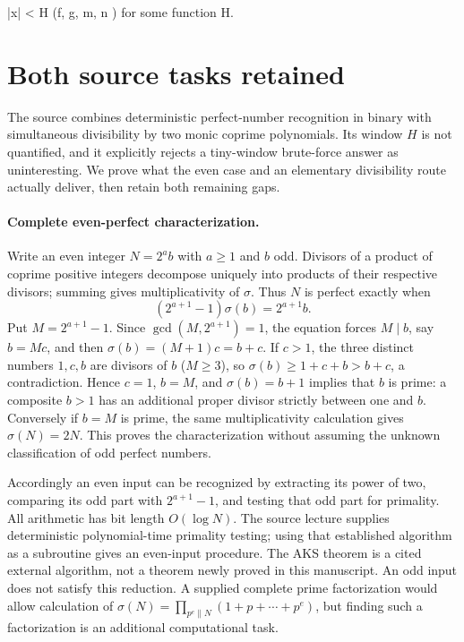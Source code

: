 \documentclass[11pt]{article}
\begin{document}
|x| < H (f, g, m, n ) for some function H.

\section{Both source tasks retained}
The source combines deterministic perfect-number recognition in binary
with simultaneous divisibility by two monic coprime polynomials. Its
window $H$ is not quantified, and it explicitly rejects a tiny-window
brute-force answer as uninteresting. We prove what the even case and
an elementary divisibility route actually deliver, then retain both
remaining gaps.

\paragraph{Complete even-perfect characterization.}
Write an even integer $N=2^a b$ with $a\ge1$ and $b$ odd. Divisors
of a product of coprime positive integers decompose uniquely into
products of their respective divisors; summing gives multiplicativity
of $\sigma$. Thus $N$ is perfect exactly when
\[
(2^{a+1}-1)\sigma(b)=2^{a+1}b.
\]
Put $M=2^{a+1}-1$. Since $\gcd(M,2^{a+1})=1$, the equation forces
$M\mid b$, say $b=Mc$, and then $\sigma(b)=(M+1)c=b+c$.
If $c>1$, the three distinct numbers $1,c,b$ are divisors of $b$
($M\ge3$), so $\sigma(b)\ge1+c+b>b+c$, a contradiction.
Hence $c=1$, $b=M$, and $\sigma(b)=b+1$ implies that $b$ is prime:
a composite $b>1$ has an additional proper divisor strictly between
one and $b$. Conversely if $b=M$ is prime, the same multiplicativity
calculation gives $\sigma(N)=2N$. This proves the characterization
without assuming the unknown classification of odd perfect numbers.

Accordingly an even input can be recognized by extracting its power of
two, comparing its odd part with $2^{a+1}-1$, and testing that odd part
for primality. All arithmetic has bit length $O(\log N)$. The source
lecture supplies deterministic polynomial-time primality testing; using
that established algorithm as a subroutine gives an even-input procedure.
The AKS theorem is a cited external algorithm, not a theorem newly
proved in this manuscript. An odd input does not satisfy this reduction.
A supplied complete prime factorization would allow calculation of
$\sigma(N)=\prod_{p^e\parallel N}(1+p+\cdots+p^e)$, but finding
such a factorization is an additional computational task.
\end{document}
